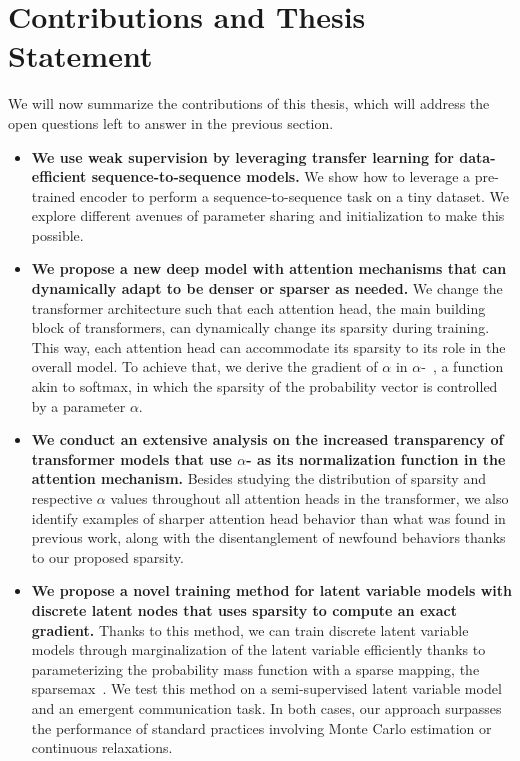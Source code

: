 \section{Contributions and Thesis Statement}
\label{sec:int_contributions}

\noindent We will now summarize the contributions of this thesis, which will
address the open questions left to answer in the previous section.

\begin{itemize}

    \item \textbf{We use weak supervision by leveraging transfer learning
              for data-efficient sequence-to-sequence models.} We show how to
          leverage a pre-trained encoder to perform a
          sequence-to-sequence task on a tiny dataset. We explore different
          avenues of parameter sharing and initialization to make this
          possible.


    \item \textbf{We propose a new deep model with attention mechanisms that can
              dynamically adapt to be denser or sparser as needed.} We change the
          transformer architecture such that each attention head, the main
          building block of transformers, can dynamically change its sparsity
          during training. This way, each attention head can accommodate its
          sparsity to its role in the overall model. To achieve that, we derive
          the gradient of $\alpha$ in $\alpha$-\entmaxtext{}~\citep{entmax}, a
          function akin to softmax, in which the sparsity of the probability
          vector is controlled by a parameter $\alpha$.

    \item \textbf{We conduct an extensive analysis on the increased
              transparency of transformer models that use {\boldmath
                      $\alpha$}-\entmaxtext{} as its normalization function in the
              attention mechanism.}
          Besides studying the distribution of sparsity and respective $\alpha$ values
          throughout all attention heads in the transformer, we also identify
          examples of sharper attention head behavior than what was found in
          previous work, along with the disentanglement of newfound behaviors
          thanks to our proposed sparsity.

    \item \textbf{We propose a novel training method for latent variable
              models with discrete latent nodes that uses sparsity to compute an
              exact gradient.} Thanks to this method, we can train discrete latent
          variable models through marginalization of the latent variable
          efficiently thanks to parameterizing the probability mass function
          with a sparse mapping, the sparsemax~\citep{sparsemax}. We test this
          method on a semi-supervised latent variable model and an emergent
          communication task. In both cases, our approach surpasses the
          performance of standard practices involving Monte Carlo estimation or
          continuous relaxations.


\end{itemize}
